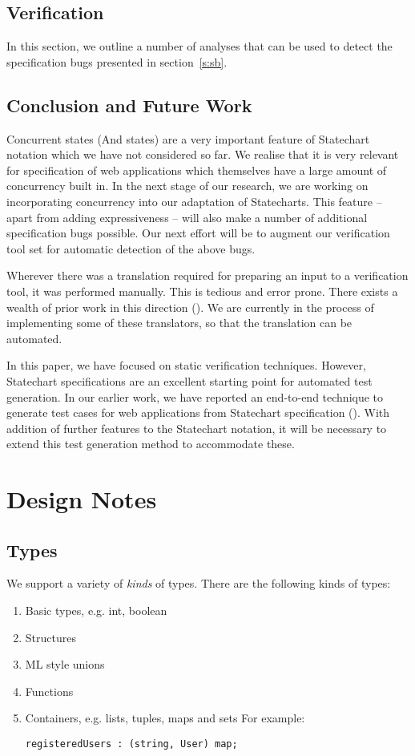 \documentclass[12pt,a4paper]{report}
\begin{document}
\section{Verification} \label{s:ver}
In this section, we outline a number of analyses that can be used to detect the specification bugs presented in section~\ref{s:sb}.

\section{Conclusion and Future Work}


Concurrent states (And states) are a very important feature of Statechart notation which we have not considered so far. We realise that it is very relevant for specification of web applications which themselves have a large amount of concurrency built in. In the next stage of our research, we are working on incorporating concurrency into our adaptation of Statecharts. This feature -- apart from adding expressiveness -- will also make a number of additional specification bugs possible. Our next effort will be to augment our verification tool set for automatic detection of the above bugs.

Wherever there was a translation required for preparing an input to a verification tool, it was performed manually. This is tedious and error prone. There exists a wealth of prior work in this direction (). We are currently in the process of implementing some of these translators, so that the translation can be automated.

In this paper, we have focused on static verification techniques. However, Statechart specifications are an excellent starting point for automated test generation. In our earlier work, we have reported an end-to-end technique to generate test cases for web applications from Statechart specification (). With addition of further features to the Statechart notation, it will be necessary to extend this test generation method to accommodate these.


\chapter{Design Notes}
\section{Types}
We support a variety of \emph{kinds} of types. There are the following kinds of types:
\begin{enumerate}
	\item Basic types, e.g. int, boolean
	\item Structures
	\item ML style unions
	\item Functions
	\item Containers, e.g. lists, tuples, maps and sets
For example:
\begin{lstlisting}
registeredUsers : (string, User) map;
\end{lstlisting}
\end{enumerate}
\end{document}
